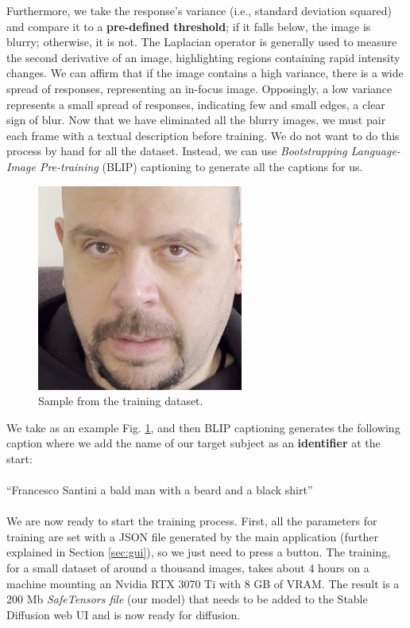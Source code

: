 \documentclass[preprint]{elsarticle}
\begin{document}
Furthermore, we take the response's variance (i.e., standard deviation squared) 
and compare it to a \textbf{pre-defined threshold}; if it falls below, the image is blurry; otherwise, it is not.
The Laplacian operator is generally used to measure the second derivative of an image, 
highlighting regions containing rapid intensity changes. 
We can affirm that if the image contains a high variance, there is a wide spread of responses, 
representing an in-focus image. Opposingly, a  low variance represents a small spread of responses, 
indicating few and small edges, a clear sign of blur.
Now that we have eliminated all the blurry images, 
we must pair each frame with a textual description before training. 
We do not want to do this process by hand for all the dataset. 
Instead, we can use \emph{Bootstrapping Language-Image Pre-training} (BLIP) captioning \cite{li2022blip} 
to generate all the captions for us. 

\begin{figure}[H]
	\centering
	\includegraphics[scale=0.3, keepaspectratio]{img/project_img/santini-training.png}
	\caption{Sample from the training dataset.}
	\label{fig:santini-training}
\end{figure}


We take as an example Fig. \ref{fig:santini-training}, 
and then BLIP captioning generates the following caption 
where we add the name of our target subject as an \textbf{identifier} at the start:\\\\
``Francesco Santini a bald man with a beard and a black shirt''\\\\
We are now ready to start the training process. 
First, all the parameters for training are set with a JSON file generated by the main application 
(further explained in Section \ref{sec:gui}), 
so we just need to press a button. 
The training, for a small dataset of around a thousand images, 
takes about 4 hours on a machine mounting an Nvidia RTX 3070 Ti with 8 GB of VRAM. 
The result is a 200 Mb \emph{SafeTensors file} (our model) 
that needs to be added to the Stable Diffusion web UI and is now ready for diffusion.
\end{document}
